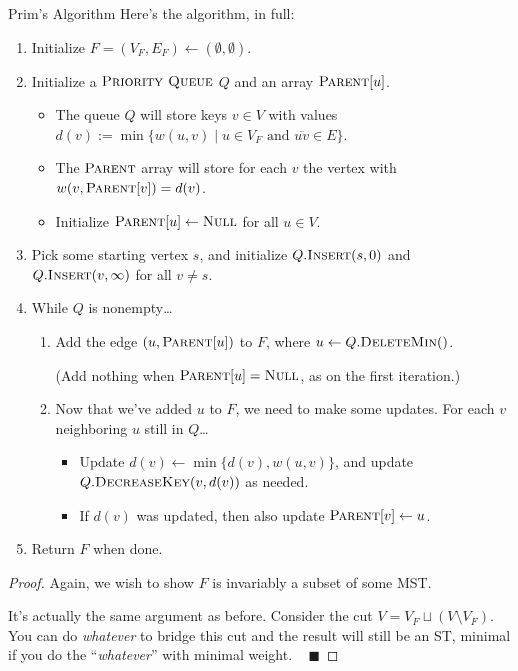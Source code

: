 \begin{solution}{Prim's Algorithm}
    Here's the algorithm, in full:
    \begin{enumerate}
        \item Initialize $F = (V_F, E_F) \leftarrow (\emptyset, \emptyset)$.
        \item Initialize a $\textsc{Priority Queue}$ $Q$ and an array $\textsc{Parent}[u]$.
        \begin{itemize}
            \item The queue $Q$ will store keys $v \in V$ with values $d(v) := \min \{ w(u, v) \mid u \in V_F \text{ and } \overline{uv} \in E\}$.
            \item The $\textsc{Parent}$ array will store for each $v$ the vertex with $w(v, \textsc{Parent}[v]) = d(v)$.
            \item Initialize $\textsc{Parent}[u] \leftarrow \textsc{Null}$ for all $u \in V$.
        \end{itemize}
        \item Pick some starting vertex $s$, and initialize $Q.\textsc{Insert}(s, 0)$ and $Q.\textsc{Insert}(v, \infty)$ for all $v \neq s$.
        \item While $Q$ is nonempty\dots
        \begin{enumerate}
            \item Add the edge $(u, \textsc{Parent}[u])$ to $F$, where $u \leftarrow Q.\textsc{DeleteMin}()$.
            
            (Add nothing when $\textsc{Parent}[u] = \textsc{Null}$, as on the first iteration.)
            \item Now that we've added $u$ to $F$, we need to make some updates.  For each $v$ neighboring $u$ still in $Q$\dots
            \begin{itemize}
                \item Update $d(v) \leftarrow  \min\{d(v), w(u, v)\}$, and update $Q.\textsc{DecreaseKey}(v, d(v))$ as needed.
                \item If $d(v)$ was updated, then also update $\textsc{Parent}[v] \leftarrow u$.
            \end{itemize}
        \end{enumerate}
        \item Return $F$ when done.
    \end{enumerate}
\end{solution}

\begin{proof}
    Again, we wish to show $F$ is invariably a subset of some MST.

    It's actually the same argument as before.  Consider the cut $V = V_F \sqcup (V \setminus V_F)$.  You can do \emph{whatever} to bridge this cut and the result will still be an ST, minimal if you do the ``\emph{whatever}'' with minimal weight. ~ $\blacksquare$
\end{proof}


